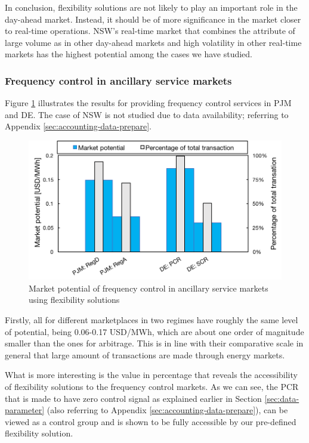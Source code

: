 In conclusion, flexibility solutions are not likely to play an important role in the day-ahead market. Instead, it should be of more significance in the market closer to real-time operations. NSW's real-time market that combines the attribute of large volume as in other day-ahead markets and high volatility in other real-time markets has the highest potential among the cases we have studied.


\subsubsection{Frequency control in ancillary service markets}

Figure \ref{fig:Potential-FC} illustrates the results for providing frequency control services in PJM and DE. The case of NSW is not studied due to data availability; referring to Appendix \ref{sec:accounting-data-prepare}. 

\begin{figure}[h!]
	\centering
	\includegraphics[width=0.95\linewidth]{Figures/Potential-FC}
	\caption{Market potential of frequency control in ancillary service markets using flexibility solutions}
	\label{fig:Potential-FC}
\end{figure}

Firstly, all for different marketplaces in two regimes have roughly the same level of potential, being 0.06-0.17 USD/MWh, which are about one order of magnitude smaller than the ones for arbitrage. This is in line with their comparative scale in general that large amount of transactions are made through energy markets.

What is more interesting is the value in percentage that reveals the accessibility of flexibility solutions to the frequency control markets. As we can see, the PCR that is made to have zero control signal as explained earlier in Section \ref{sec:data-parameter} (also referring to Appendix \ref{sec:accounting-data-prepare}), can be viewed as a control group and is shown to be fully accessible by our pre-defined flexibility solution. 

